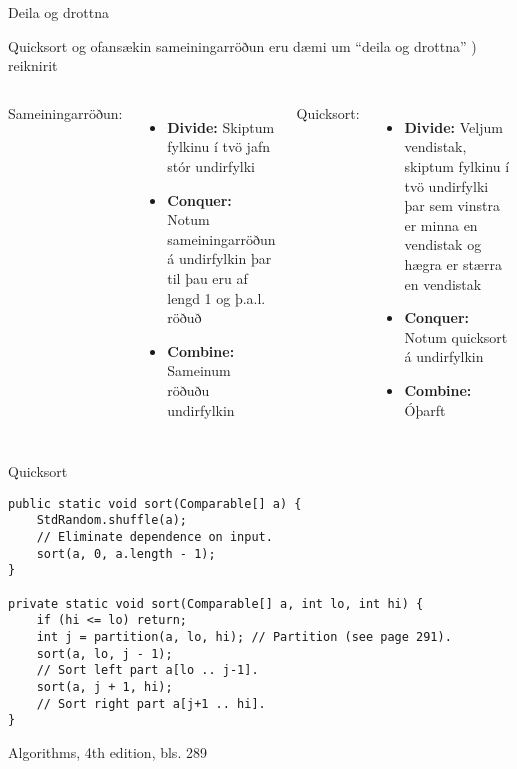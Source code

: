 \documentclass[handout]{beamer}
\begin{document}
\begin{frame}{Deila og drottna}
	\begin{center}
		Quicksort og ofansækin sameiningarröðun eru dæmi um ``deila og drottna'' ) reiknirit
	\end{center}
	\begin{columns}
		Sameiningarröðun:
		\begin{itemize}
			\item[] \textbf{Divide:} Skiptum fylkinu í tvö jafn stór undirfylki
			\item[] \textbf{Conquer:} Notum sameiningarröðun á undirfylkin þar til þau eru af lengd 1 og þ.a.l. röðuð
			\item[] \textbf{Combine:} Sameinum röðuðu undirfylkin
		\end{itemize}
		Quicksort:
		\begin{itemize}
			\item[] \textbf{Divide:} Veljum vendistak, skiptum fylkinu í tvö undirfylki þar sem vinstra er minna en vendistak og hægra er stærra en vendistak
			\item[] \textbf{Conquer:} Notum quicksort á undirfylkin
			\item[] \textbf{Combine:} Óþarft
		\end{itemize}
	\end{columns}
\end{frame}

\headonly

\begin{frame}[fragile]{Quicksort}
	\vspace{0.5cm}
	\begin{verbatim}
public static void sort(Comparable[] a) {
    StdRandom.shuffle(a);
    // Eliminate dependence on input.
    sort(a, 0, a.length - 1);
}

private static void sort(Comparable[] a, int lo, int hi) {
    if (hi <= lo) return;
    int j = partition(a, lo, hi); // Partition (see page 291).
    sort(a, lo, j - 1);
    // Sort left part a[lo .. j-1].
    sort(a, j + 1, hi);
    // Sort right part a[j+1 .. hi].
}
    \end{verbatim}
	\begin{center}
		Algorithms, 4th edition, bls. 289
	\end{center}
\end{frame}
\end{document}
